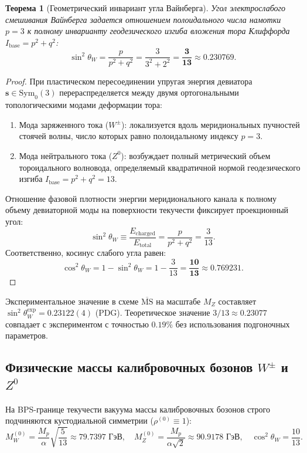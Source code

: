 \documentclass[11pt,a4paper]{article}
\newtheorem{theorem}{Теорема}[section]
\theoremstyle{definition}
\theoremstyle{remark}
\begin{document}
\begin{theorem}[Геометрический инвариант угла Вайнберга]
Угол электрослабого смешивания Вайнберга задается отношением полоидального числа намотки $p=3$ к полному инварианту геодезического изгиба вложения тора Клиффорда $I_{\mathrm{base}} = p^2 + q^2$:
\begin{equation}
    \sin^2\theta_W = \frac{p}{p^2 + q^2} = \frac{3}{3^2 + 2^2} = \boldsymbol{\frac{3}{13}} \approx 0.230769.
    \label{eq:weinberg_exact}
\end{equation}
\end{theorem}

\begin{proof}
При пластическом пересоединении упругая энергия девиатора $\mathbf{s} \in \mathrm{Sym}_0(3)$ перераспределяется между двумя ортогональными топологическими модами деформации тора:
\begin{enumerate}
    \item Мода заряженного тока ($W^\pm$): локализуется вдоль меридиональных пучностей стоячей волны, число которых равно полоидальному индексу $p = 3$.
    \item Мода нейтрального тока ($Z^0$): возбуждает полный метрический объем тороидального волновода, определяемый квадратичной нормой геодезического изгиба $I_{\mathrm{base}} = p^2 + q^2 = 13$.
\end{enumerate}
Отношение фазовой плотности энергии меридионального канала к полному объему девиаторной моды на поверхности текучести фиксирует проекционный угол:
\begin{equation}
    \sin^2\theta_W \equiv \frac{E_{\mathrm{charged}}}{E_{\mathrm{total}}} = \frac{p}{p^2 + q^2} = \frac{3}{13}.
\end{equation}
Соответственно, косинус слабого угла равен:
\begin{equation}
    \cos^2\theta_W = 1 - \sin^2\theta_W = 1 - \frac{3}{13} = \boldsymbol{\frac{10}{13}} \approx 0.769231.
\end{equation}
\end{proof}

Экспериментальное значение в схеме $\overline{\mathrm{MS}}$ на масштабе $M_Z$ составляет $\sin^2\theta_W^{\mathrm{exp}} = 0.23122(4)$ (PDG). Теоретическое значение $3/13 \approx 0.23077$ совпадает с экспериментом с точностью $0.19\%$ без использования подгоночных параметров.

\subsection{Физические массы калибровочных бозонов $W^\pm$ и $Z^0$}
На BPS-границе текучести вакуума массы калибровочных бозонов строго подчиняются 
кустодиальной симметрии ($\rho^{(0)} \equiv 1$):
\begin{equation}
	M_W^{(0)} = \frac{M_p}{\alpha}\sqrt{\frac{5}{13}} \approx 79.7397\text{ ГэВ}, \quad 
	M_Z^{(0)} = \frac{M_p}{\alpha\sqrt{2}} \approx 90.9178\text{ ГэВ}, \quad 
	\cos^2\theta_W = \frac{10}{13}.
\end{equation}
\end{document}
